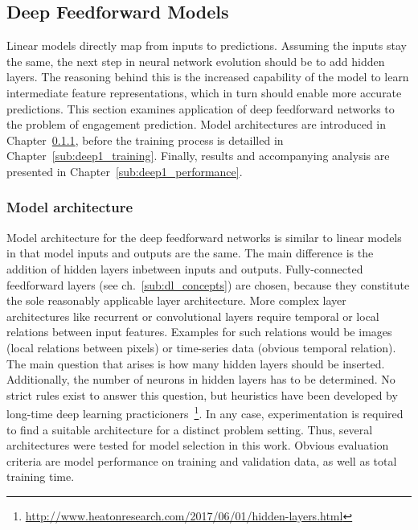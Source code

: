 \subsection{Deep Feedforward Models}
\label{sec:deep1}

Linear models directly map from inputs to predictions.
Assuming the inputs stay the same, the next step in neural network evolution
should be to add hidden layers.
The reasoning behind this is the increased capability of the model to learn intermediate
feature representations, which in turn should enable more accurate predictions.
This section examines application of deep feedforward networks to the problem
of engagement prediction.
Model architectures are introduced in Chapter~\ref{sub:deep1_architecture}, 
before the training process is detailled in Chapter~\ref{sub:deep1_training}.
Finally, results and accompanying analysis are presented in Chapter~\ref{sub:deep1_performance}.

\subsubsection{Model architecture}
\label{sub:deep1_architecture}

Model architecture for the deep feedforward networks is similar to linear models
in that model inputs and outputs are the same.
The main difference is the addition of hidden layers inbetween inputs and outputs.
Fully-connected feedforward layers (see ch.~\ref{sub:dl_concepts}) are chosen,
because they constitute the sole reasonably applicable layer architecture.
More complex layer architectures like recurrent or convolutional layers require
temporal or local relations between input features.
Examples for such relations would be images (local relations between pixels)
or time-series data (obvious temporal relation).
The main question that arises is how many hidden layers should be inserted.
Additionally, the number of neurons in hidden layers has to be determined.
No strict rules exist to answer this question, but heuristics have been developed
by long-time deep learning practicioners~\footnote{\url{http://www.heatonresearch.com/2017/06/01/hidden-layers.html}}.
In any case, experimentation is required to find a suitable architecture for a distinct problem setting.
Thus, several architectures were tested for model selection in this work.
Obvious evaluation criteria are model performance on training and validation data,
as well as total training time.

